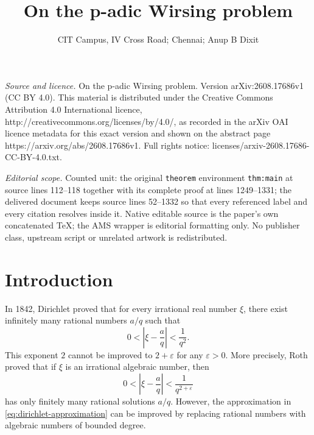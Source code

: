 \documentclass[10pt,a4paper]{amsart}
\begin{document}
\title[On the p-adic Wirsing problem]{On the p-adic Wirsing problem}
\author{CIT Campus, IV Cross Road; Chennai; Anup B Dixit}
\date{}
\maketitle
\noindent\emph{Source and licence.} On the p-adic Wirsing problem. Version arXiv:2608.17686v1 (CC BY 4.0). This material is distributed under the Creative Commons Attribution 4.0 International licence, http://creativecommons.org/licenses/by/4.0/, as recorded in the arXiv OAI licence metadata for this exact version and shown on the abstract page https://arxiv.org/abs/2608.17686v1. Full rights notice: licenses/arxiv-2608.17686-CC-BY-4.0.txt.\par\smallskip
\noindent\textit{Editorial scope.} Counted unit: the original \texttt{theorem} environment \texttt{thm:main} at source lines 112--118 together with its complete proof at lines 1249--1331; the delivered document keeps source lines 52--1332 so that every referenced label and every citation resolves inside it. Native editable source is the paper's own concatenated TeX; the AMS wrapper is editorial formatting only. No publisher class, upstream script or unrelated artwork is redistributed.
\section{\bf Introduction}
\bigskip
In 1842, Dirichlet \cite{Dirichlet} proved that for every irrational real
number $\xi$, there exist infinitely many rational numbers $a/q$ such that
\begin{equation}\label{eq:dirichlet-approximation}
0<\left|\xi-\frac aq\right|<\frac1{q^2}.
\end{equation}
This exponent $2$ cannot be improved to $2+\varepsilon$ for any
$\varepsilon>0$. More precisely, Roth \cite{Roth} proved that if $\xi$ is an
irrational algebraic number, then
$$
0<\left|\xi-\frac aq\right|<\frac1{q^{2+\varepsilon}}
$$
has only finitely many rational solutions $a/q$. However, the approximation
in \eqref{eq:dirichlet-approximation} can be improved by replacing
rational numbers with algebraic numbers of bounded degree.\\
\end{document}
